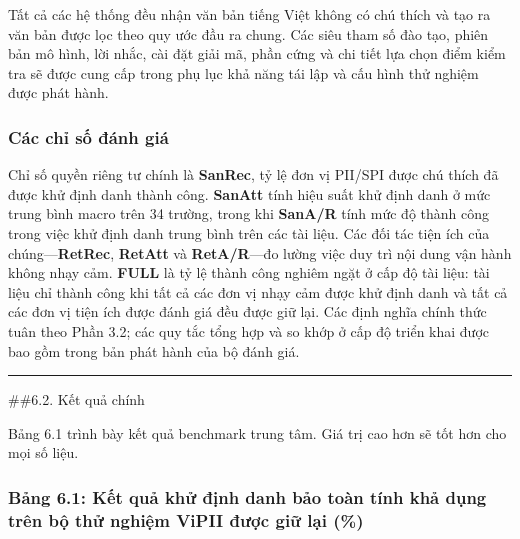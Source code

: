 \documentclass[
  11pt,
  a4paper,
]{article}
\begin{document}
Tất cả các hệ thống đều nhận văn bản tiếng Việt không có chú thích và
tạo ra văn bản được lọc theo quy ước đầu ra chung. Các siêu tham số đào
tạo, phiên bản mô hình, lời nhắc, cài đặt giải mã, phần cứng và chi tiết
lựa chọn điểm kiểm tra sẽ được cung cấp trong phụ lục khả năng tái lập
và cấu hình thử nghiệm được phát hành.

\subsubsection{Các chỉ số đánh
giá}\label{cuxe1c-chux1ec9-sux1ed1-ux111uxe1nh-giuxe1}

Chỉ số quyền riêng tư chính là \textbf{SanRec}, tỷ lệ đơn vị PII/SPI
được chú thích đã được khử định danh thành công. \textbf{SanAtt} tính
hiệu suất khử định danh ở mức trung bình macro trên 34 trường, trong khi
\textbf{SanA/R} tính mức độ thành công trong việc khử định danh trung
bình trên các tài liệu. Các đối tác tiện ích của
chúng---\textbf{RetRec}, \textbf{RetAtt} và \textbf{RetA/R}---đo lường
việc duy trì nội dung vận hành không nhạy cảm. \textbf{FULL} là tỷ lệ
thành công nghiêm ngặt ở cấp độ tài liệu: tài liệu chỉ thành công khi
tất cả các đơn vị nhạy cảm được khử định danh và tất cả các đơn vị tiện
ích được đánh giá đều được giữ lại. Các định nghĩa chính thức tuân theo
Phần 3.2; các quy tắc tổng hợp và so khớp ở cấp độ triển khai được bao
gồm trong bản phát hành của bộ đánh giá.

\begin{center}\rule{0.5\linewidth}{0.5pt}\end{center}

\#\#6.2. Kết quả chính

Bảng 6.1 trình bày kết quả benchmark trung tâm. Giá trị cao hơn sẽ tốt
hơn cho mọi số liệu.

\subsubsection{Bảng 6.1: Kết quả khử định danh bảo toàn tính khả dụng
trên bộ thử nghiệm ViPII được giữ lại
(\%)}\label{bux1ea3ng-6.1-kux1ebft-quux1ea3-khux1eed-ux111ux1ecbnh-danh-bux1ea3o-touxe0n-tuxednh-khux1ea3-dux1ee5ng-truxean-bux1ed9-thux1eed-nghiux1ec7m-vipii-ux111ux1b0ux1ee3c-giux1eef-lux1ea1i}
\end{document}
